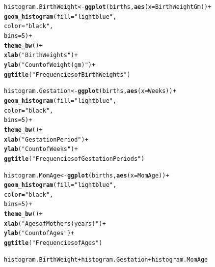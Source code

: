 \documentclass{article}\usepackage[]{graphicx}\usepackage[]{xcolor}
\makeatletter
\newcommand{\hlnum}[1]{\textcolor[rgb]{0.686,0.059,0.569}{#1}}%
\newcommand{\hlstr}[1]{\textcolor[rgb]{0.192,0.494,0.8}{#1}}%
\newcommand{\hlopt}[1]{\textcolor[rgb]{0,0,0}{#1}}%
\newcommand{\hlstd}[1]{\textcolor[rgb]{0.345,0.345,0.345}{#1}}%
\newcommand{\hlkwb}[1]{\textcolor[rgb]{0.69,0.353,0.396}{#1}}%
\newcommand{\hlkwc}[1]{\textcolor[rgb]{0.333,0.667,0.333}{#1}}%
\newcommand{\hlkwd}[1]{\textcolor[rgb]{0.737,0.353,0.396}{\textbf{#1}}}%
\newenvironment{kframe}{%
 \def\at@end@of@kframe{}%
 \ifinner\ifhmode%
  \def\at@end@of@kframe{\end{minipage}}%
  \begin{minipage}{\columnwidth}%
 \fi\fi%
 \def\FrameCommand##1{\hskip\@totalleftmargin \hskip-\fboxsep
 \colorbox{shadecolor}{##1}\hskip-\fboxsep
     \hskip-\linewidth \hskip-\@totalleftmargin \hskip\columnwidth}%
 \MakeFramed {\advance\hsize-\width
   \@totalleftmargin\z@ \linewidth\hsize
   \@setminipage}}%
 {\par\unskip\endMakeFramed%
 \at@end@of@kframe}
\newenvironment{knitrout}{}{} %
\makeatother
\begin{document}
\begin{enumerate}[a.]
\begin{knitrout}
\color{fgcolor}\begin{kframe}
\begin{alltt}
\hlstd{histogram.BirthWeight}\hlkwb{<-} \hlkwd{ggplot}\hlstd{(births,} \hlkwd{aes}\hlstd{(}\hlkwc{x}\hlstd{=BirthWeightGm))}\hlopt{+}
  \hlkwd{geom_histogram}\hlstd{(}\hlkwc{fill} \hlstd{=} \hlstr{"lightblue"}\hlstd{,}
                 \hlkwc{color} \hlstd{=} \hlstr{"black"}\hlstd{,}
                 \hlkwc{bins} \hlstd{=} \hlnum{5}\hlstd{)} \hlopt{+}
  \hlkwd{theme_bw}\hlstd{()} \hlopt{+}
  \hlkwd{xlab}\hlstd{(}\hlstr{"Birth Weights"}\hlstd{)}\hlopt{+}
  \hlkwd{ylab}\hlstd{(}\hlstr{"Count of Weight(gm)"}\hlstd{)}\hlopt{+}
  \hlkwd{ggtitle}\hlstd{(}\hlstr{"Frequencies of Birth Weights"}\hlstd{)}


\hlstd{histogram.Gestation}\hlkwb{<-} \hlkwd{ggplot}\hlstd{(births,} \hlkwd{aes}\hlstd{(}\hlkwc{x}\hlstd{=Weeks))}\hlopt{+}
  \hlkwd{geom_histogram}\hlstd{(}\hlkwc{fill} \hlstd{=} \hlstr{"lightblue"}\hlstd{,}
                 \hlkwc{color} \hlstd{=} \hlstr{"black"}\hlstd{,}
                 \hlkwc{bins} \hlstd{=} \hlnum{5}\hlstd{)} \hlopt{+}
  \hlkwd{theme_bw}\hlstd{()} \hlopt{+}
  \hlkwd{xlab}\hlstd{(}\hlstr{"Gestation Period"}\hlstd{)}\hlopt{+}
  \hlkwd{ylab}\hlstd{(}\hlstr{"Count of Weeks"}\hlstd{)}\hlopt{+}
  \hlkwd{ggtitle}\hlstd{(}\hlstr{"Frequencies of Gestation Periods"}\hlstd{)}

\hlstd{histogram.MomAge} \hlkwb{<-} \hlkwd{ggplot}\hlstd{(births,} \hlkwd{aes}\hlstd{(}\hlkwc{x}\hlstd{=MomAge))}\hlopt{+}
  \hlkwd{geom_histogram}\hlstd{(}\hlkwc{fill} \hlstd{=} \hlstr{"lightblue"}\hlstd{,}
                 \hlkwc{color} \hlstd{=} \hlstr{"black"}\hlstd{,}
                 \hlkwc{bins} \hlstd{=} \hlnum{5}\hlstd{)} \hlopt{+}
  \hlkwd{theme_bw}\hlstd{()} \hlopt{+}
  \hlkwd{xlab}\hlstd{(}\hlstr{"Ages of Mothers(years)"}\hlstd{)}\hlopt{+}
  \hlkwd{ylab}\hlstd{(}\hlstr{"Count of Ages"}\hlstd{)}\hlopt{+}
  \hlkwd{ggtitle}\hlstd{(}\hlstr{"Frequencies of Ages"}\hlstd{)}

\hlstd{histogram.BirthWeight} \hlopt{+} \hlstd{histogram.Gestation} \hlopt{+} \hlstd{histogram.MomAge}
\end{alltt}
\end{kframe}
\end{knitrout}


\end{enumerate}
\end{document}
